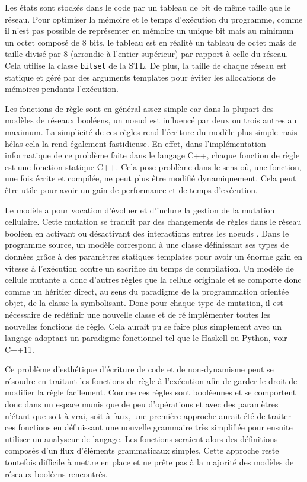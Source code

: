 \documentclass[11pt, a4paper]{article}
\begin{document}
Les états sont stockés dans le code par un tableau de bit de même taille que le
réseau. Pour optimiser la mémoire et le temps d'exécution du programme, comme
il n'est pas possible de représenter en mémoire un unique bit mais au minimum
un octet composé de 8 bits, le tableau est en réalité un tableau de octet mais
de taille divisé par 8 (arrondie à l'entier supérieur) par rapport à celle du
réseau. Cela utilise la classe \texttt{bitset} de la STL. De plus, la taille de
chaque réseau est statique et géré par des arguments templates pour éviter les
allocations de mémoires pendants l'exécution.

Les fonctions de règle sont en général assez simple car dans la plupart des
modèles de réseaux booléens, un noeud est influencé par deux ou trois autres au
maximum. La simplicité de ces règles rend l'écriture du modèle plus simple mais
hélas cela la rend également fastidieuse.  En effet, dans l'implémentation
informatique de ce problème faite dans le langage C++, chaque fonction de règle
est une fonction statique C++. Cela pose problème dans le sens où, une
fonction, une fois écrite et compilée, ne peut plus être modifié dynamiquement.
Cela peut être utile pour avoir un gain de performance et de temps d'exécution.

Le modèle a pour vocation d'évoluer et d'inclure la gestion de la mutation
cellulaire. Cette mutation se traduit par des changements de règles dans le
réseau booléen en activant ou désactivant des interactions entres les noeuds
\cite{calzone2010}.  Dans le programme source, un modèle correspond à une
classe définissant ses types de données grâce à des paramètres statiques
templates pour avoir un énorme gain en vitesse à l'exécution contre un
sacrifice du temps de compilation.  Un modèle de cellule mutante a donc
d'autres règles que la cellule originale et se comporte donc comme un héritier
direct, au sens du paradigme de la programmation orientée objet, de la classe
la symbolisant.  Donc pour chaque type de mutation, il est nécessaire de
redéfinir une nouvelle classe et de ré implémenter toutes les nouvelles
fonctions de règle. Cela aurait pu se faire plus simplement avec un langage
adoptant un paradigme fonctionnel tel que le Haskell ou Python, voir C++11.

Ce problème d'esthétique d'écriture de code et de non-dynamisme peut se
résoudre en traitant les fonctions de règle à l'exécution afin de garder le
droit de modifier la règle facilement. Comme ces règles sont booléennes et se
comportent donc dans un espace munis que de peu d'opérations et avec des
paramètres n'étant que soit à vrai, soit à faux, une première approche aurait
été de traiter ces fonctions en définissant une nouvelle grammaire très
simplifiée pour ensuite utiliser un analyseur de langage.  Les fonctions
seraient alors des définitions composés d'un flux d'éléments grammaticaux
simples. Cette approche reste toutefois difficile à mettre en place et ne prête
pas à la majorité des modèles de réseaux booléens rencontrés.
\end{document}
